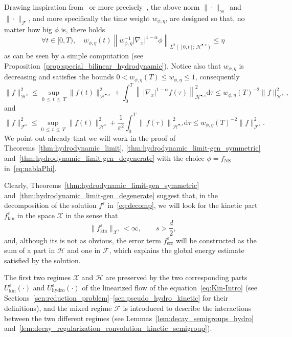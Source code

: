 \documentclass[AHL,Unicode,longabstracts,published]{cedram}
\newcommand{\err}{\mathrm{err}}
\newcommand{\ns}{\mathrm{NS}}
\newcommand{\hyd}{\mathrm{hydro}}
\newcommand{\kin}{\mathrm{kin}}
\renewcommand{\d}{\mathrm{d}}
\newcommand{\HH}{\mathcal{H}}
\newcommand{\FFF}{\mathscr{F}}
\newcommand{\HHH}{\mathscr{H}}
\newcommand{\GGG}{\mathscr{X}}
\newcommand{\rSSs}[1]{\HH^{#1}}
\newcommand{\rSSsp}[1]{\HH^{{\bullet}, #1}}
\newcommand{\SSSs}{\HHH}
\newcommand{\rSSSs}[1]{\HHH^{#1}}
\newcommand{\SSSl}{\GGG}
\newcommand{\rSSSl}[1]{\GGG^{#1}}
\newcommand{\SSSm}{\FFF}
\newcommand{\rSSSm}[1]{\FFF^{#1}}
\renewcommand*\le{\leqslant}
\renewcommand*\leq{\leqslant}
\newcommand*\eps{{\varepsilon}}
\let\oldforall\forall
\renewcommand*{\forall}{\mathrel{\oldforall}}
\begin{document}
\begin{rema}
Drawing inspiration from~\cite{GT2020} or more precisely~\cite{G2023}, the above norm $\|\cdot\|_{\SSSs}$ and $\| \cdot \|_\SSSm$, and more specifically the time weight $w_{\phi, \eta}$, are designed so that, no matter how big $\phi$ is, there holds
\begin{equation}\label{eq:NS_exponential_weight}
\forall t \in [0, T), \quad w_{\phi, \eta}(t) \left\| w_{\phi, \eta}^{-1} | \nabla_{x} |^{1-\alpha} \phi \right\|_{L^2 \left([0, t] ;\, {\rSSsp{s}} \right) } \le \eta
\end{equation}
as can be seen by a simple computation (see Proposition~\ref{prop:special_bilinear_hydrodynamic}). Notice also that $w_{\phi, \eta}$ is decreasing and satisfies the bounds $0 < w_{\phi, \eta}(T) \le w_{\phi, \eta} \le 1$, consequently
\begin{equation}\label{eq:roughNt}
\| f \|_{\rSSSs{s}}^2 \le \sup_{0\,\leq\,t\,\leq\,T}\|f(t)\|_{\rSSsp{s}}^2+\int_0^T\left\|\,|\nabla_x|^{1-\alpha}f(\tau)\right\|_{\rSSsp{s}}^2\d \tau \le w_{\phi, \eta}(T)^{-2} \| f \|_{\rSSSs{s}}^2,
\end{equation}
and
\begin{equation*}
\| f \|_{\rSSSm{s}}^2 \le \sup_{0\,\leq\,t\,\leq\,T}\|f(t)\|_{\rSSs{s}}^2 + \frac{1}{\eps^2} \int_0^T\left\|\,f(\tau)\right\|_{\rSSsp{s}}^2\d \tau \le w_{\phi, \eta}(T)^{-2} \| f \|_{\rSSSm{s}}^2.
\end{equation*}
We point out already that we will work in the proof of Theorems~\ref{thm:hydrodynamic_limit}, \ref{thm:hydrodynamic_limit-gen_symmetric} and~\ref{thm:hydrodynamic_limit-gen_degenerate} with the choice $\phi=f_\ns$ in~\eqref{eq:nablaPhi}.
\end{rema}

\begin{rema}
Clearly, Theorems~\ref{thm:hydrodynamic_limit-gen_symmetric} and~\ref{thm:hydrodynamic_limit-gen_degenerate} suggest that, in the decomposition of the solution $f^\eps$ in~\eqref{eq:decomp}, we will look for the kinetic part $f^\eps_\kin$ in the space $\SSSl$ in the sense that
\[
\| f^\eps_\kin\|_{\rSSSl{s}} < \infty, \qquad s >\frac{d}{2},
\]
and, although its is not as obvious, the error term $f^\eps_\err$ will be constructed as the sum of a part in $\SSSs$ and one in $\SSSm$, which explains the global energy estimate satisfied by the solution.

The first two regimes $\SSSl$ and $\SSSs$ are preserved by the two corresponding parts $U^\eps_\kin(\cdot)$ and $U^\eps_\hyd(\cdot)$ of the linearized flow of the equation~\eqref{eq:Kin-Intro} (see Sections~\ref{scn:reduction_problem}--\ref{scn:pseudo_hydro_kinetic} for their definitions), and the mixed regime $\SSSm$ is introduced to describe the interactions between the two different regimes (see Lemmas~\ref{lem:decay_semigroups_hydro} and~\ref{lem:decay_regularization_convolution_kinetic_semigroup}).
\end{rema}
\end{document}
